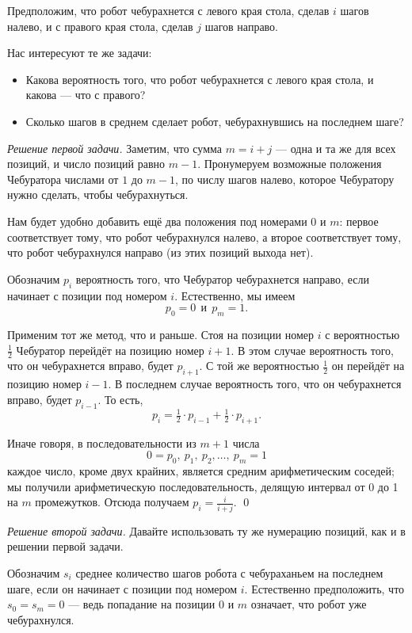 \documentclass{article}
\begin{document}
Предположим, что робот чебурахнется с левого края стола, сделав $i$ шагов налево,
и с правого края стола, сделав $j$ шагов направо.

Нас интересуют те же задачи:

\begin{itemize}
\item Какова вероятность того, что робот чебурахнется с левого края стола, и какова --- что с правого?
\item Сколько шагов в среднем сделает робот, чебурахнувшись на последнем шаге?
\end{itemize}

\medskip
\noindent\textit{Решение первой задачи.}
Заметим, что сумма $m=i+j$ --- одна и та же для всех позиций, и число позиций равно $m-1$.
Пронумеруем возможные положения Чебуратора числами от $1$ до $m-1$,
по числу шагов налево, которое Чебуратору нужно сделать, чтобы чебурахнуться.

Нам будет удобно добавить ещё два положения под номерами $0$ и $m$:
первое соответствует тому, что робот чебурахнулся налево, 
а второе соответствует тому, что робот чебурахнулся направо
(из этих позиций выхода нет).

Обозначим $p_i$ вероятность того, что Чебуратор чебурахнется направо,
если начинает с позиции под номером $i$.
Естественно, мы имеем 
\[p_0=0\ \  \text{и}\ \  p_{m}=1.\]

Применим тот же метод, что и раньше.
Стоя на позиции номер $i$ с вероятностью $\tfrac12$ Чебуратор перейдёт на позицию номер $i+1$.
В этом случае вероятность того, что он чебурахнется вправо, будет $p_{i+1}$.
С той же вероятностью $\tfrac12$ он перейдёт на позицию номер $i-1$. 
В последнем случае вероятность того, что он чебурахнется вправо, будет $p_{i-1}$.
То есть,
\[p_i=\tfrac12\cdot p_{i-1}+\tfrac12\cdot p_{i+1}.\]

Иначе говоря, в последовательности из $m+1$ числа
\[0=p_0,\ p_1,\ p_2,\dots,\ p_{m}=1\] 
каждое число, кроме двух крайних, является средним арифметическим 
соседей; мы получили арифметическую последовательность, делящую интервал от 0 до 1 на $m$ промежутков.
Отсюда получаем $p_i=\tfrac i{i+j}$.
\qed

\medskip
\noindent\textit{Решение второй задачи.}
Давайте использовать ту же нумерацию позиций, как и в решении первой задачи.

Обозначим $s_i$ среднее количество шагов робота с чебураханьем на последнем шаге, если он начинает с позиции под номером $i$.
Естественно предположить, что $s_0=s_{m}=0$ ---
ведь попадание на позиции $0$ и $m$ означает, что робот уже чебурахнулся.
\end{document}
